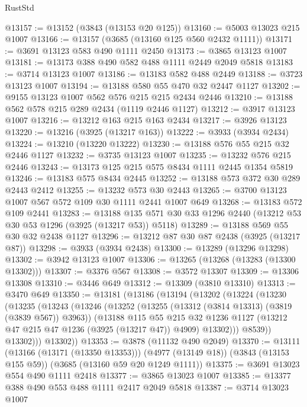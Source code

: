 \begin{lexlean}{RustStd}
\begin{coremodule}
@13157 := @13152 (@3843 (@13153 @20 @125))
@13160 := @5003 @13023 @215 @1007
@13166 := @13157 (@3685 (@13160 @125 @560 @2432 @1111))
@13171 := @3691 @13123 @583 @490 @1111 @2450
@13173 := @3865 @13123 @1007
@13181 := @13173 @388 @490 @582 @488 @1111 @2449 @2049 @5818
@13183 := @3714 @13123 @1007
@13186 := @13183 @582 @488 @2449
@13188 := @3723 @13123 @1007
@13194 := @13188 @580 @55 @470 @32 @2447 @1127
@13202 := @9155 @13123 @1007 @562 @576 @215 @215 @2434 @2446
@13210 := @13188 @562 @578 @215 @289 @2434 (@1119 @2446 @1127)
@13212 := @3917 @13123 @1007
@13216 := @13212 @163 @215 @163 @2434
@13217 := @3926 @13123
@13220 := @13216 (@3925 (@13217 @163))
@13222 := @3933 (@3934 @2434)
@13224 := @13210 (@13220 @13222)
@13230 := @13188 @576 @55 @215 @32 @2446 @1127
@13232 := @3735 @13123 @1007
@13235 := @13232 @576 @215 @2446
@13243 := @13173 @125 @215 @575 @8434 @1111 @2445 @1354 @5819
@13246 := @13183 @575 @8434 @2445
@13252 := @13188 @573 @372 @30 @289 @2443 @2412
@13255 := @13232 @573 @30 @2443
@13265 := @3700 @13123 @1007 @567 @572 @109 @30 @1111 @2441 @1007 @649
@13268 := @13183 @572 @109 @2441
@13283 := @13188 @135 @571 @30 @33 @1296 @2440 (@13212 @53 @30 @53 @1296 (@3925 (@13217 @53)) @5118)
@13289 := @13188 @569 @55 @30 @32 @2438 @1127
@13296 := @13212 @87 @30 @87 @2438 (@3925 (@13217 @87))
@13298 := @3933 (@3934 @2438)
@13300 := @13289 (@13296 @13298)
@13302 := @3942 @13123 @1007
@13306 := @13265 (@13268 (@13283 (@13300 @13302)))
@13307 := @3376 @567
@13308 := @3572 @13307
@13309 := @13306 @13308
@13310 := @3446 @649
@13312 := @13309 (@3810 @13310)
@13313 := @3470 @649
@13350 := @13181
    (@13186
      (@13194
        (@13202
          (@13224
            (@13230
              (@13235
                (@13243
                  (@13246
                    (@13252
                      (@13255 (@13312 (@3814 @13313) (@3819 (@3839 @567)) @3963))
                      (@13188
                        @115
                        @55
                        @215
                        @32
                        @1236
                        @1127
                        (@13212 @47 @215 @47 @1236 (@3925 (@13217 @47)) @4909)
                        @13302)))
                  @8539))
              @13302)))
        @13302))
@13353 := @3878 (@11132 @490 @2049)
@13370 := @13111
    (@13166 (@13171 (@13350 @13353)))
    (@4977 (@13149 @18))
    (@3843 (@13153 @155 @59))
    (@3685 (@13160 @59 @20 @1249 @1111))
@13375 := @3691 @13023 @554 @490 @1111 @2418
@13377 := @3865 @13023 @1007
@13385 := @13377 @388 @490 @553 @488 @1111 @2417 @2049 @5818
@13387 := @3714 @13023 @1007

\end{coremodule}
\end{lexlean}
